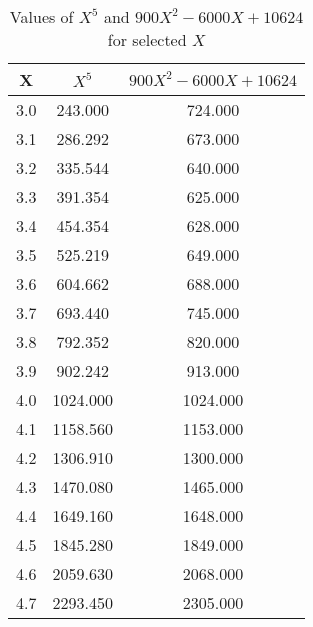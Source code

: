 ﻿%
\begin{table}[h!]
    \centering
    \caption{Values of $X^5$ and $900X^2 - 6000X + 10624$ for selected $X$}
    \begin{tabular}{|c|c|c|}
        \hline
        \textbf{X} & \textbf{$X^5$} & \textbf{$900X^2 - 6000X + 10624$} \\ \hline
        3.0        & 243.000        & 724.000                           \\ \hline
        3.1        & 286.292        & 673.000                           \\ \hline
        3.2        & 335.544        & 640.000                           \\ \hline
        3.3        & 391.354        & 625.000                           \\ \hline
        3.4        & 454.354        & 628.000                           \\ \hline
        3.5        & 525.219        & 649.000                           \\ \hline
        3.6        & 604.662        & 688.000                           \\ \hline
        3.7        & 693.440        & 745.000                           \\ \hline
        3.8        & 792.352        & 820.000                           \\ \hline
        3.9        & 902.242        & 913.000                           \\ \hline
        4.0        & 1024.000       & 1024.000                          \\ \hline
        4.1        & 1158.560       & 1153.000                          \\ \hline
        4.2        & 1306.910       & 1300.000                          \\ \hline
        4.3        & 1470.080       & 1465.000                          \\ \hline
        4.4        & 1649.160       & 1648.000                          \\ \hline
        4.5        & 1845.280       & 1849.000                          \\ \hline
        4.6        & 2059.630       & 2068.000                          \\ \hline
        4.7        & 2293.450       & 2305.000                          \\ \hline

\end{tabular}
\end{table}
